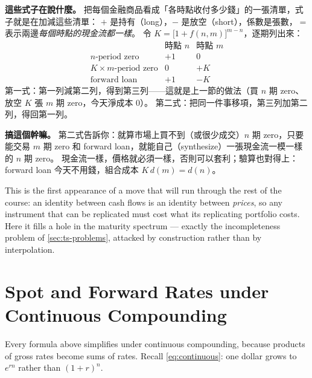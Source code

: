 \suppstart
\begin{remark}
	\textbf{這些式子在說什麼。}
	把每個金融商品看成「各時點收付多少錢」的一張清單，式子就是在加減這些清單：
	$+$ 是持有（long），$-$ 是放空（short），係數是張數，$=$ 表示兩邊\emph{每個時點的現金流都一樣}。
	令 $K=\bigl[1+f(n,m)\bigr]^{m-n}$，逐期列出來：
	\[
		\begin{array}{lcc}
			                          & \text{時點 } n & \text{時點 } m \\ \hline
			n\text{-period zero}      & +1             & 0              \\
			K\times m\text{-period zero} & 0           & +K             \\
			\text{forward loan}       & +1             & -K
		\end{array}
	\]
	第一式：第一列減第二列，得到第三列——這就是上一節的做法（買 $n$ 期 zero、放空 $K$ 張 $m$ 期 zero，今天淨成本 $0$）。
	第二式：把同一件事移項，第三列加第二列，得回第一列。

	\textbf{搞這個幹嘛。}
	第二式告訴你：就算市場上買不到（或很少成交）$n$ 期 zero，只要能交易 $m$ 期 zero 和 forward loan，就能自己（synthesize）一張現金流一模一樣的 $n$ 期 zero。
	現金流一樣，價格就必須一樣，否則可以套利；驗算也對得上：forward loan 今天不用錢，組合成本 $K\,d(m)=d(n)$。
\end{remark}

\begin{note}
	This is the first appearance of a move that will run through the rest of the course: an identity between cash flows is an identity between \emph{prices}, so any instrument that can be replicated must cost what its replicating portfolio costs.
	Here it fills a hole in the maturity spectrum --- exactly the incompleteness problem of \autoref{sec:ts-problems}, attacked by construction rather than by interpolation.
\end{note}
\suppend

\section{Spot and Forward Rates under Continuous Compounding}
\label{sec:cc-forward}


Every formula above simplifies under continuous compounding, because products of gross rates become sums of rates.
Recall \eqref{eq:continuous}: one dollar grows to $e^{rn}$ rather than $(1+r)^{n}$.

